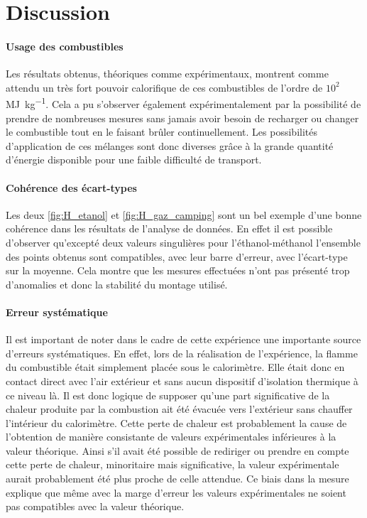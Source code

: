 \section{Discussion}

\paragraph*{Usage des combustibles}
Les résultats obtenus, théoriques comme expérimentaux, montrent comme attendu un très fort pouvoir calorifique de ces combustibles de l'ordre de \(10^2\) \si{\mega\joule\per\kilo\gram}. Cela a pu s'observer également expérimentalement par la possibilité de prendre de nombreuses mesures sans jamais avoir besoin de recharger ou changer le combustible tout en le faisant brûler continuellement. Les possibilités d'application de ces mélanges sont donc diverses grâce à la grande quantité d'énergie disponible pour une faible difficulté de transport.

\paragraph*{Cohérence des écart-types}
Les deux \autoref{fig:H_etanol} et \autoref{fig:H_gaz_camping} sont un bel exemple d'une bonne cohérence dans les résultats de l'analyse de données. En effet il est possible d'observer qu'excepté deux valeurs singulières pour l'éthanol-méthanol l'ensemble des points obtenus sont compatibles, avec leur barre d'erreur, avec l'écart-type sur la moyenne. Cela montre que les mesures effectuées n'ont pas présenté trop d'anomalies et donc la stabilité du montage utilisé.


\paragraph*{Erreur systématique}
Il est important de noter dans le cadre de cette expérience une importante source d'erreurs systématiques. En effet, lors de la réalisation de l'expérience, la flamme du combustible était simplement placée sous le calorimètre. Elle était donc en contact direct avec l'air extérieur et sans aucun dispositif d'isolation thermique à ce niveau là. Il est donc logique de supposer qu'une part significative de la chaleur produite par la combustion ait été évacuée vers l'extérieur sans chauffer l'intérieur du calorimètre. Cette perte de chaleur est probablement la cause de l'obtention de manière consistante de valeurs expérimentales inférieures à la valeur théorique. Ainsi s'il avait été possible de rediriger ou prendre en compte cette perte de chaleur, minoritaire mais significative, la valeur expérimentale aurait probablement été plus proche de celle attendue. Ce biais dans la mesure explique que même avec la marge d'erreur les valeurs expérimentales ne soient pas compatibles avec la valeur théorique.


